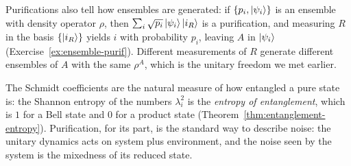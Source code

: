 Purifications also tell how ensembles are generated: if $\{p_i,\left|\psi_i\right\rangle\}$ is an ensemble with density operator $\rho$, then $\sum_i\sqrt{p_i}\left|\psi_i\right\rangle\left|i_R\right\rangle$ is a purification, and measuring $R$ in the basis $\{\left|i_R\right\rangle\}$ yields $i$ with probability $p_i$, leaving $A$ in $\left|\psi_i\right\rangle$ (Exercise~\ref{ex:ensemble-purif}).
Different measurements of $R$ generate different ensembles of $A$ with the same $\rho^A$, which is the unitary freedom we met earlier.

\begin{lookahead}
  The Schmidt coefficients are the natural measure of how entangled a pure state is: the Shannon entropy of the numbers $\lambda_i^2$ is the \emph{entropy of entanglement}, which is $1$ for a Bell state and $0$ for a product state (Theorem~\ref{thm:entanglement-entropy}). Purification, for its part, is the standard way to describe noise: the unitary dynamics acts on system plus environment, and the noise seen by the system is the mixedness of its reduced state.
\end{lookahead}

